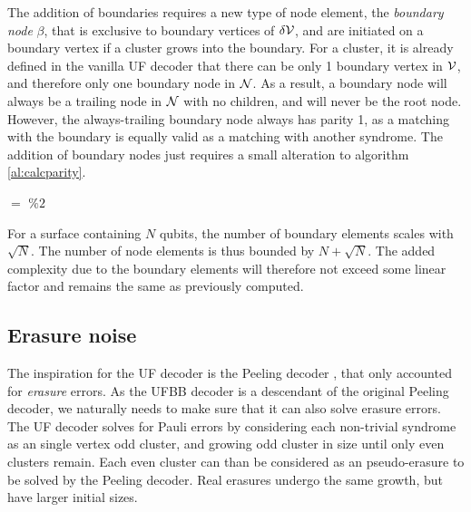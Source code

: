 The addition of boundaries requires a new type of node element, the \emph{boundary node} $\beta$, that is exclusive to boundary vertices of $\delta\mathcal{V}$, and are initiated on a boundary vertex if a cluster grows into the boundary. For a cluster, it is already defined in the vanilla UF decoder that there can be only 1 boundary vertex in $\mathcal{V}$, and therefore only one boundary node in $\mathcal{N}$. As a result, a boundary node will always be a trailing node in $\mathcal{N}$ with no children, and will never be the root node. However, the always-trailing boundary node  always has parity 1, as a matching with the boundary is equally valid as a matching with another syndrome. The addition of boundary nodes just requires a small alteration to algorithm \ref{al:calcparity}.

\begin{algo}[algotitle=CalcParity for surfaces with boundaries, label=al:calcparity2]
\begin{algorithm}[H]

\KwData{\node}

\BlankLine

\parity $=$  $\%2$\;
\end{algorithm}
\end{algo}

For a surface containing $N$ qubits, the number of boundary elements scales with $\sqrt{N}$. The number of node elements is thus bounded by $N + \sqrt{N}$. The added complexity due to the boundary elements will therefore not exceed some linear factor and remains the same as previously computed.


\subsection{Erasure noise}

The inspiration for the UF decoder is the Peeling decoder \cite{delfosse2017linear}, that only accounted for \emph{erasure} errors. As the UFBB decoder is a descendant of the original Peeling decoder, we naturally needs to make sure that it can also solve erasure errors. The UF decoder solves for Pauli errors by considering each non-trivial syndrome as an single vertex odd cluster, and growing odd cluster in size until only even clusters remain. Each even cluster can than be considered as an pseudo-erasure to be solved by the Peeling decoder. Real erasures undergo the same growth, but have larger initial sizes.

